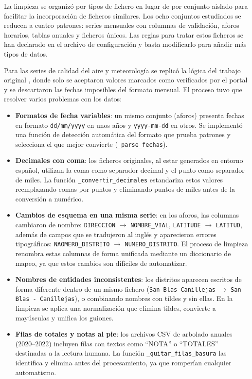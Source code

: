 La limpieza se organizó por tipos de fichero en lugar de por conjunto aislado para facilitar la incorporación de ficheros similares. Los ocho conjuntos estudiados se reducen a cuatro patrones: series mensuales con columnas de validación, aforos horarios, tablas anuales y ficheros únicos. Las reglas para tratar estos ficheros se han declarado en el archivo de configuración y basta modificarlo para añadir más tipos de datos.

Para las series de calidad del aire y meteorología se replicó la lógica del trabajo original \citep{Meneses2023Madrid}, donde solo se aceptaron valores marcados como verificados por el portal y se descartaron las fechas imposibles del formato mensual. El proceso tuvo que resolver varios problemas con los datos:

\begin{itemize}
	\item \textbf{Formatos de fecha variables}: un mismo conjunto (aforos) presenta fechas en formato \texttt{dd/mm/yyyy} en unos años y \texttt{yyyy-mm-dd} en otros. Se implementó una función de detección automática del formato que prueba patrones y selecciona el que mejor convierte (\texttt{\_parse\_fechas}).
	\item \textbf{Decimales con coma}: los ficheros originales, al estar generados en entorno español, utilizan la coma como separador decimal y el punto como separador de miles. La función \texttt{\_convertir\_decimales} estandariza estos valores reemplazando comas por puntos y eliminando puntos de miles antes de la conversión a numérico.
	\item \textbf{Cambios de esquema en una misma serie}: en los aforos, las columnas cambiaron de nombre: \texttt{DIRECCION} $\to$ \texttt{NOMBRE\_VIAL}, \texttt{LATITUDE} $\to$ \texttt{LATITUD}, además de campos que se tradujeron al inglés y aparecieron errores tipográficos: \texttt{NAOMERO\_DISTRITO} $\to$ \texttt{NUMERO\_DISTRITO}. El proceso de limpieza renombra estas columnas de forma unificada mediante un diccionario de mapeo, ya que estos cambios son difíciles de automatizar.
	\item \textbf{Nombres de entidades inconsistentes}: los distritos aparecen escritos de forma diferente dentro de un mismo fichero (\texttt{San Blas-Canillejas} $\to$ \texttt{San Blas - Canillejas}), o combinando nombres con tildes y sin ellas. En la limpieza se aplica una normalización que elimina tildes, convierte a mayúsculas y unifica los guiones.
	\item \textbf{Filas de totales y notas al pie}: los archivos CSV de arbolado anuales (2020–2022) incluyen filas con textos como ``NOTA'' o ``TOTALES'' destinadas a la lectura humana. La función \texttt{\_quitar\_filas\_basura} las identifica y elimina antes del procesamiento, ya que romperían cualquier automatismo.
\end{itemize}

